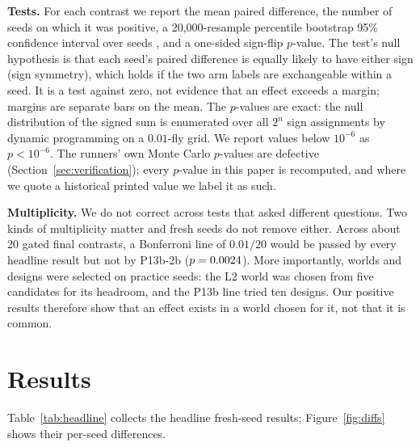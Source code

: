 \documentclass[11pt]{article}
\begin{document}
\textbf{Tests.} For each contrast we report the mean paired difference, the number of seeds on which it was positive, a 20,000-resample percentile bootstrap 95\% confidence interval over seeds \citep{efron1993bootstrap}, and a one-sided sign-flip $p$-value. The test's null hypothesis is that each seed's paired difference is equally likely to have either sign (sign symmetry), which holds if the two arm labels are exchangeable within a seed. It is a test against zero, not evidence that an effect exceeds a margin; margins are separate bars on the mean. The $p$-values are exact: the null distribution of the signed sum is enumerated over all $2^n$ sign assignments by dynamic programming on a $0.01$-fly grid. We report values below $10^{-6}$ as $p<10^{-6}$. The runners' own Monte Carlo $p$-values are defective (Section~\ref{sec:verification}); every $p$-value in this paper is recomputed, and where we quote a historical printed value we label it as such.

\textbf{Multiplicity.} We do not correct across tests that asked different questions. Two kinds of multiplicity matter and fresh seeds do not remove either. Across about 20 gated final contrasts, a Bonferroni line of $0.01/20$ would be passed by every headline result but not by P13b-2b ($p = 0.0024$). More importantly, worlds and designs were selected on practice seeds: the L2 world was chosen from five candidates for its headroom, and the P13b line tried ten designs. Our positive results therefore show that an effect exists in a world chosen for it, not that it is common.

\section{Results}
\label{sec:results}

Table~\ref{tab:headline} collects the headline fresh-seed results; Figure~\ref{fig:diffs} shows their per-seed differences.
\end{document}
